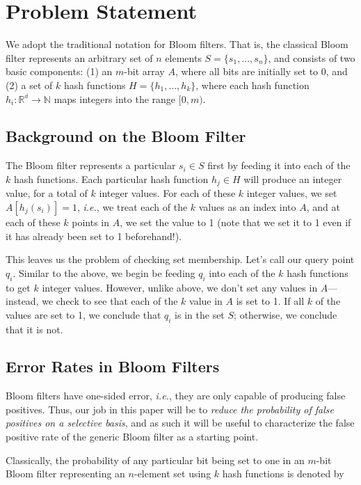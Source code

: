 \documentclass[11pt]{article}
\begin{document}
\section{Problem Statement}

We adopt the traditional notation for Bloom filters. That is, the classical Bloom filter represents an arbitrary set of $n$ elements $S = \{ s_1, \ldots, s_n \}$, and consists of two basic components: (1) an $m$-bit array $A$, where all bits are initially set to 0, and (2) a set of $k$ hash functions $H = \{ h_1, \ldots, h_k \}$, where each hash function $h_i : \mathbb{R^d} \rightarrow \mathbb{N}$ maps integers into the range $[0,m)$.

\subsection{Background on the Bloom Filter}

The Bloom filter represents a particular $s_i \in S$ first by feeding it into each of the $k$ hash functions. Each particular hash function $h_j \in H$ will produce an integer value, for a total of $k$ integer values. For each of these $k$ integer values, we set $A[h_j(s_i)] = 1$, \textit{i.e.}, we treat each of the $k$ values as an index into $A$, and at each of these $k$ points in $A$, we set the value to 1 (note that we set it to 1 even if it has already been set to 1 beforehand!).

This leaves us the problem of checking set membership. Let's call our query point $q_i$. Similar to the above, we begin be feeding $q_i$ into each of the $k$ hash functions to get $k$ integer values. However, unlike above, we don't set any values in $A$---instead, we check to see that each of the $k$ value in $A$ is set to 1. If all $k$ of the values are set to 1, we conclude that $q_i$ is in the set $S$; otherwise, we conclude that it is not.

\subsection{Error Rates in Bloom Filters}

Bloom filters have one-sided error, \textit{i.e.}, they are only capable of producing false positives. Thus, our job in this paper will be to \textit{reduce the probability of false positives on a selective basis}, and as such it will be useful to characterize the false positive rate of the generic Bloom filter as a starting point.

Classically, the probability of any particular bit being set to one in an $m$-bit Bloom filter representing an $n$-element set using $k$ hash functions is denoted by
\end{document}

